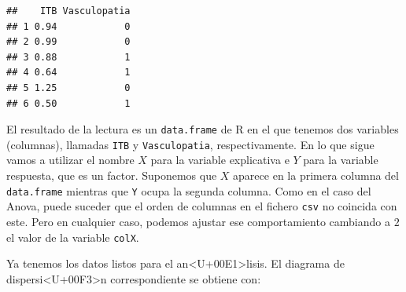 \documentclass[10pt,a4paper]{article}
\begin{document}
\begin{knitrout}
\color{fgcolor}\begin{kframe}
\begin{alltt}
 \hlkwb{=} \hlstd{(}\hlstd{,}
                           \hlstd{=} \hlstd{,} \hlstd{=}\hlstd{)}
\end{alltt}
\begin{verbatim}
##    ITB Vasculopatia
## 1 0.94            0
## 2 0.99            0
## 3 0.88            1
## 4 0.64            1
## 5 1.25            0
## 6 0.50            1
\end{verbatim}
\end{kframe}
\end{knitrout}

El resultado de la lectura es un {\tt data.frame} de R en el que tenemos dos variables (columnas), llamadas {\tt ITB} y {\tt Vasculopatia}, respectivamente. En lo que sigue vamos a utilizar el nombre $X$ para la variable explicativa e $Y$ para la variable respuesta, que es un factor. Suponemos que $X$ aparece en la primera columna del {\tt data.frame} mientras que {\tt Y} ocupa la segunda columna. Como en el caso del Anova, puede suceder que el orden de columnas en el fichero {\tt csv} no coincida con este. Pero en cualquier caso, podemos ajustar ese comportamiento cambiando a $2$ el valor de la variable {\tt colX}.

\begin{knitrout}
\color{fgcolor}\begin{kframe}
\begin{alltt}
 \hlkwb{=} 
 \hlopt{==} \hlstd{)\{}
   \hlkwb{=} \hlstd{datosFichero[ ,} \hlstd{]}
   \hlkwb{=} \hlstd{datosFichero[ ,} \hlstd{]}
\hlstd{\}}  \hlstd{\{}
   \hlkwb{=} \hlstd{datosFichero[ ,} \hlstd{]}
   \hlkwb{=} \hlstd{datosFichero[ ,} \hlstd{]}
\hlstd{\}}
 \hlkwb{=} 
\end{alltt}
\end{kframe}
\end{knitrout}

Ya tenemos los datos listos para el an<U+00E1>lisis. El diagrama de dispersi<U+00F3>n correspondiente se obtiene con:
\end{document}
